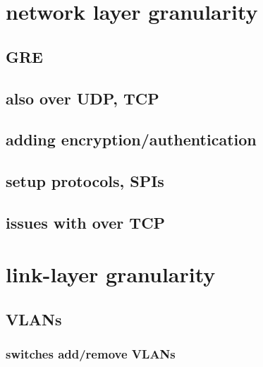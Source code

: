 \section{network layer granularity}




\subsection{GRE}



\subsection{also over UDP, TCP}

\subsection{adding encryption/authentication}

\subsection{setup protocols, SPIs}

\subsection{issues with over TCP}

\section{link-layer granularity}

\subsection{VLANs}

\subsubsection{switches add/remove VLANs}


